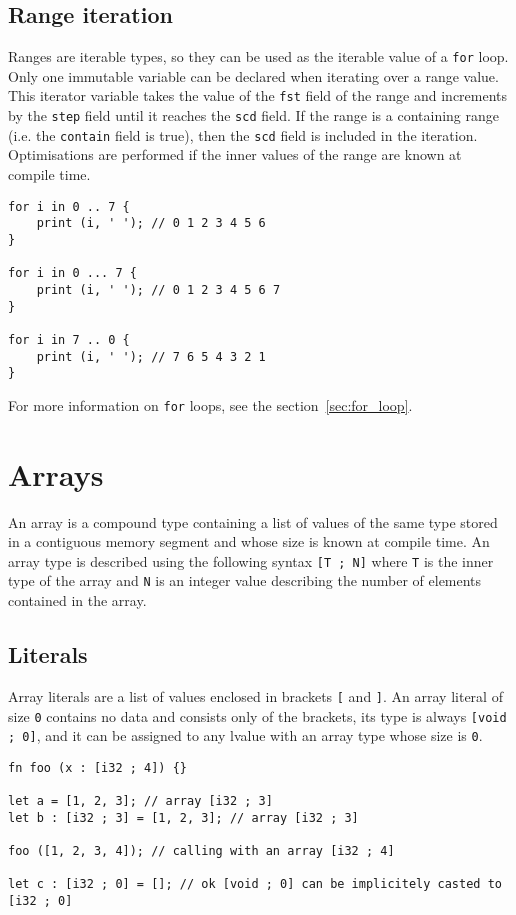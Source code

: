 \subsection {Range iteration}

 Ranges are iterable types, so they can be used as the iterable value of a
 \texttt{for} loop. Only one immutable variable can be declared when iterating
 over a range value. This iterator variable takes the value of the \texttt{fst}
 field of the range and increments by the \texttt{step} field until it reaches
 the \texttt{scd} field. If the range is a containing range (i.e. the
 \texttt{contain} field is true), then the \texttt{scd} field is included in
 the iteration. Optimisations are performed if the inner values of the range are
 known at compile time.

\begin{lstlisting}[style=coloredverbatim]
for i in 0 .. 7 {
    print (i, ' '); // 0 1 2 3 4 5 6
}

for i in 0 ... 7 {
    print (i, ' '); // 0 1 2 3 4 5 6 7
}

for i in 7 .. 0 {
    print (i, ' '); // 7 6 5 4 3 2 1
}
\end{lstlisting}

 For more information on \texttt{for} loops, see the section~\ref{sec:for_loop}.

\section{Arrays}

 An array is a compound type containing a list of values of the same type stored
 in a contiguous memory segment and whose size is known at compile time. An
 array type is described using the following syntax \texttt{[T ; N]} where
 \texttt{T} is the inner type of the array and \texttt{N} is an integer value
 describing the number of elements contained in the array.

\subsection {Literals}

Array literals are a list of values enclosed in brackets \texttt{[} and
  \texttt{]}. An array literal of size \texttt{0} contains no data and consists
only of the brackets, its type is always \texttt{[void ; 0]}, and it can be
assigned to any lvalue with an array type whose size is \texttt{0}.

\begin{lstlisting}[style=coloredverbatim]
fn foo (x : [i32 ; 4]) {}

let a = [1, 2, 3]; // array [i32 ; 3]
let b : [i32 ; 3] = [1, 2, 3]; // array [i32 ; 3]

foo ([1, 2, 3, 4]); // calling with an array [i32 ; 4]

let c : [i32 ; 0] = []; // ok [void ; 0] can be implicitely casted to [i32 ; 0]
\end{lstlisting}

